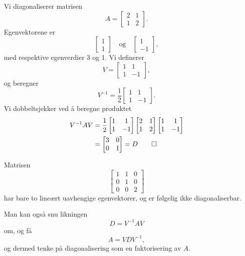 \begin{ex}	
Vi diagonaliserer matrisen 
\[
A=
\begin{bmatrix}
2     & 1 \\
1      & 2
\end{bmatrix}.
\]
Egenvektorene er 
\[
\begin{bmatrix}
1 \\ 1
\end{bmatrix}
\quad \text{og} \quad
\begin{bmatrix}
1 \\ -1
\end{bmatrix},
\]
med respektive egenverdier 3 og 1. Vi definerer
\[
V=
\begin{bmatrix}
1 & 1 \\ 1 &-1
\end{bmatrix},
\]
og beregner 
\[
V^{-1}=
\frac{1}{2}
\begin{bmatrix}
1 & 1 \\ 1 &-1
\end{bmatrix}.
\]
Vi dobbeltsjekker ved å beregne produktet
\begin{align*}
V^{-1}AV&=
\frac{1}{2}
\begin{bmatrix}
1 & 1 \\ 1 &-1
\end{bmatrix}
\begin{bmatrix}
2     & 1 \\
1      & 2
\end{bmatrix}
\begin{bmatrix}
1 & 1 \\ 1 &-1
\end{bmatrix}
\\& =
\begin{bmatrix}
3     & 0 \\
0      & 1
\end{bmatrix}
=
D \qedhere
\end{align*}
\end{ex}


\begin{ex}
Matrisen 
\[
\begin{bmatrix}
1 & 1 & 0\\  0 &1 & 0 \\ 0 & 0 & 2
\end{bmatrix}
\]
har bare to lineært uavhengige egenvektorer, og er følgelig ikke diagonaliserbar.
\end{ex}

Man kan også snu likningen
\[
D=V^{-1}AV
\]
om, og få
\[
A=VDV^{-1},
\]
og dermed tenke på diagonalisering som en faktorisering av $A$.

